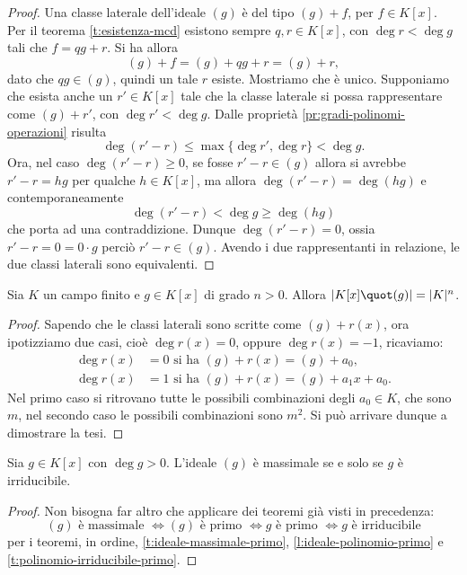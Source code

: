 \begin{proof}
	Una classe laterale dell'ideale $(g)$ è del tipo $(g)+f$, per $f\in K[x]$.
	Per il teorema \ref{t:esistenza-mcd} esistono sempre $q,r\in K[x]$, con $\deg r<\deg g$ tali che $f=qg+r$.
	Si ha allora
	\begin{equation*}
		(g) + f = (g) + qg + r = (g) + r,
	\end{equation*}
	dato che $qg\in (g)$, quindi un tale $r$ esiste.
	Mostriamo che è unico.
	Supponiamo che esista anche un $r'\in K[x]$ tale che la classe laterale si possa rappresentare come $(g)+r'$, con $\deg r'<\deg g$.
	Dalle proprietà \ref{pr:gradi-polinomi-operazioni} risulta
	\begin{equation*}
		\deg (r'-r)\leq\max\{\deg r',\deg r\}<\deg g.
	\end{equation*}
	Ora, nel caso $\deg(r'-r)\ge 0$, se fosse $r'-r\in(g)$ allora si avrebbe $r'-r=hg$ per qualche $h\in K[x]$, ma allora $\deg(r'-r)=\deg(hg)$ e contemporaneamente
	\begin{equation*}
		\deg(r'-r)<\deg g\ge \deg(hg)
	\end{equation*}
	che porta ad una contraddizione.
	Dunque $\deg(r'-r)=0$, ossia $r'-r=0=0\cdot g$ perciò $r'-r\in(g)$.
	Avendo i due rappresentanti in relazione, le due classi laterali sono equivalenti.
\end{proof}
\begin{corollario}
	Sia $K$ un campo finito e $g\in K[x]$ di grado $n>0$.
	Allora $|K[x]\quot(g)|=|K|^n$.
\end{corollario}
\begin{proof}
	Sapendo che le classi laterali sono scritte come $(g)+r(x)$, ora ipotizziamo due casi, cioè $\deg r(x) = 0$, oppure $\deg r(x) = -1$, ricaviamo:
	\begin{align*}
		\deg r(x) &= 0 \text{ si ha $(g) + r(x) = (g) + a_0$,}\\
		\deg r(x) &= 1 \text{ si ha $(g) + r(x) = (g) + a_1x + a_0$.}
	\end{align*}
	Nel primo caso si ritrovano tutte le possibili combinazioni degli $a_0\in K$, che sono $m$, nel secondo caso le possibili combinazioni sono $m^2$. Si può arrivare dunque a dimostrare la tesi.
\end{proof}
\begin{teorema}
	Sia $g\in K[x]$ con $\deg g>0$.
	L'ideale $(g)$ è massimale se e solo se $g$ è irriducibile.
\end{teorema}
\begin{proof}
	Non bisogna far altro che applicare dei teoremi già visti in precedenza:
	\begin{equation*}
		(g)\text{ è massimale }\iff (g)\text{ è primo }\iff g\text{ è primo }\iff g\text{ è irriducibile}
	\end{equation*}
	per i teoremi, in ordine, \ref{t:ideale-massimale-primo}, \ref{l:ideale-polinomio-primo} e \ref{t:polinomio-irriducibile-primo}.
\end{proof}
